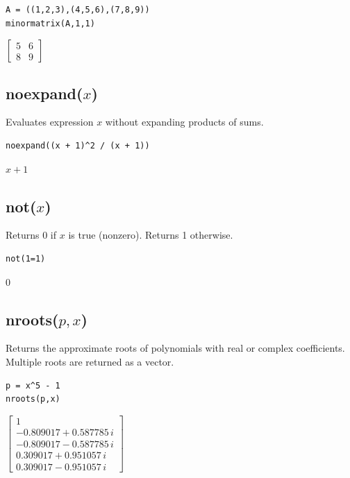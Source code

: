 \documentclass[12pt]{article}
\begin{document}
{\color{blue}
\begin{verbatim}
A = ((1,2,3),(4,5,6),(7,8,9))
minormatrix(A,1,1)
\end{verbatim}
}

$\displaystyle
\begin{bmatrix}
5 & 6
\\[1ex]
8 & 9
\end{bmatrix}
$

\subsection*{noexpand($x$)}

Evaluates expression $x$ without expanding products of sums.

{\color{blue}
\begin{verbatim}
noexpand((x + 1)^2 / (x + 1))
\end{verbatim}
}

$x + 1$

\subsection*{not($x$)}

Returns 0 if $x$ is true (nonzero).
Returns 1 otherwise.

{\color{blue}
\begin{verbatim}
not(1=1)
\end{verbatim}
}

$0$

\subsection*{nroots($p,x$)}

Returns the approximate roots of polynomials with real or complex coefficients.
Multiple roots are returned as a vector.

{\color{blue}
\begin{verbatim}
p = x^5 - 1
nroots(p,x)
\end{verbatim}
}

$\displaystyle
\begin{bmatrix}
1
\\[1ex]
-0.809017 + 0.587785\,i
\\[1ex]
-0.809017 - 0.587785\,i
\\[1ex]
0.309017 + 0.951057\,i
\\[1ex]
0.309017 - 0.951057\,i
\end{bmatrix}
$
\end{document}
